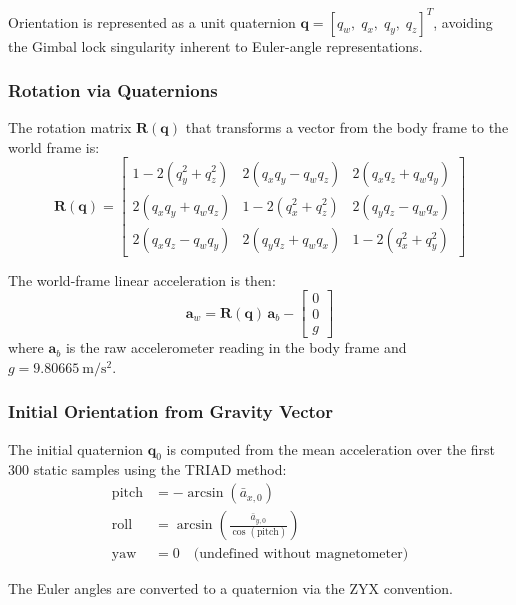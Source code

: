Orientation is represented as a unit quaternion $\mathbf{q} = [q_w,\; q_x,\; q_y,\; q_z]^T$, avoiding the Gimbal lock singularity inherent to Euler-angle representations.

\subsubsection{Rotation via Quaternions}

The rotation matrix $\mathbf{R}(\mathbf{q})$ that transforms a vector from the body frame to the world frame is:
\begin{equation}\label{eq:rotmat}
  \mathbf{R}(\mathbf{q}) = \begin{bmatrix}
    1 - 2(q_y^2 + q_z^2) & 2(q_x q_y - q_w q_z) & 2(q_x q_z + q_w q_y) \\
    2(q_x q_y + q_w q_z) & 1 - 2(q_x^2 + q_z^2) & 2(q_y q_z - q_w q_x) \\
    2(q_x q_z - q_w q_y) & 2(q_y q_z + q_w q_x) & 1 - 2(q_x^2 + q_y^2)
  \end{bmatrix}
\end{equation}

The world-frame linear acceleration is then:
\begin{equation}\label{eq:grav_removal}
  \mathbf{a}_w = \mathbf{R}(\mathbf{q}) \, \mathbf{a}_b - \begin{bmatrix} 0 \\ 0 \\ g \end{bmatrix}
\end{equation}
where $\mathbf{a}_b$ is the raw accelerometer reading in the body frame and $g = \SI{9.80665}{\metre\per\second\squared}$.

\subsubsection{Initial Orientation from Gravity Vector}

The initial quaternion $\mathbf{q}_0$ is computed from the mean acceleration over the first 300 static samples using the TRIAD method:
\begin{align}
  \text{pitch} &= -\arcsin(\bar{a}_{x,0}) \\
  \text{roll}  &= \arcsin\!\left(\frac{\bar{a}_{y,0}}{\cos(\text{pitch})}\right) \\
  \text{yaw}   &= 0 \quad \text{(undefined without magnetometer)}
\end{align}

The Euler angles are converted to a quaternion via the ZYX convention.

